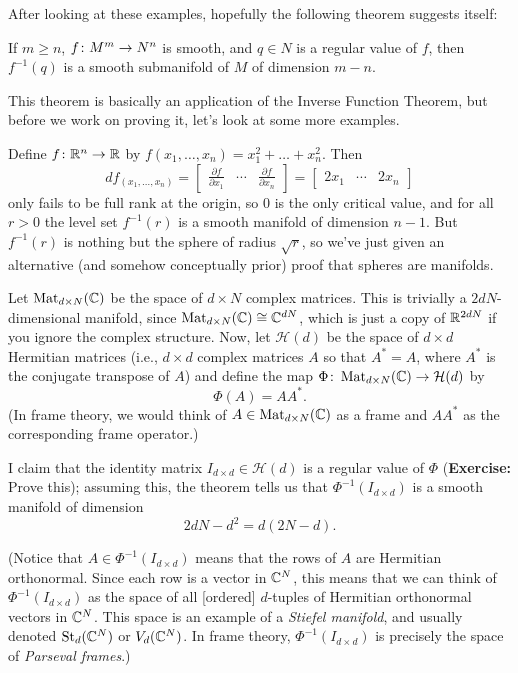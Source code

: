 	After looking at these examples, hopefully the following theorem suggests itself:
	
	\begin{theorem}\label{thm:level set theorem}
		If $m \geq n$, $f \colon\thinspace\! M^m \to N^n$ is smooth, and $q \in N$ is a regular value of $f$, then $f^{-1}(q)$ is a smooth submanifold of $M$ of dimension $m-n$.
	\end{theorem}
	
	This theorem is basically an application of the Inverse Function Theorem, but before we work on proving it, let's look at some more examples.
	
	\begin{example}\label{ex:sphere as level set}
		Define $f \colon\thinspace\! \mathbb{R}^n \to \mathbb{R}$ by $f(x_1,\dots , x_n) = x_1^2 + \dots + x_n^2$. Then
		\[
			df_{(x_1, \dots , x_n)}= \begin{bmatrix} \frac{\partial f}{\partial x_1} & \cdots & \frac{\partial f}{\partial x_n} \end{bmatrix} = \begin{bmatrix} 2x_1 & \cdots & 2x_n \end{bmatrix}
		\]
		only fails to be full rank at the origin, so 0 is the only critical value, and for all $r > 0$ the level set $f^{-1}(r)$ is a smooth manifold of dimension $n-1$. But $f^{-1}(r)$ is nothing but the sphere of radius $\sqrt{r}$, so we've just given an alternative (and somehow conceptually prior) proof that spheres are manifolds.
	\end{example}
	
	\begin{example}
		Let $\operatorname{Mat}_{d \times N}(\mathbb{C})$ be the space of $d \times N$ complex matrices. This is trivially a $2dN$-dimensional manifold, since $\operatorname{Mat}_{d \times N} (\mathbb{C}) \cong \mathbb{C}^{dN}$, which is just a copy of $\mathbb{R}^{2dN}$ if you ignore the complex structure. Now, let $\mathcal{H}(d)$ be the space of $d \times d$ Hermitian matrices (i.e., $d \times d$ complex matrices $A$ so that $A^\ast = A$, where $A^\ast$ is the conjugate transpose of $A$) and define the map $\Phi\colon\thinspace\! \operatorname{Mat}_{d \times N}(\mathbb{C}) \to \mathcal{H}(d)$ by
		\[
			\Phi(A) = A A^\ast.
		\]
		(In frame theory, we would think of $A \in \operatorname{Mat}_{d \times N}(\mathbb{C})$ as a frame and $A A^\ast$ as the corresponding frame operator.)
		
		I claim that the identity matrix $I_{d \times d} \in \mathcal{H}(d)$ is a regular value of $\Phi$ (\textbf{Exercise:} Prove this); assuming this, the theorem tells us that $\Phi^{-1}(I_{d \times d})$ is a smooth manifold of dimension
		\[
			2dN - d^2 = d(2N-d).
		\]
		
		(Notice that $A \in \Phi^{-1}(I_{d \times d})$ means that the rows of $A$ are Hermitian orthonormal. Since each row is a vector in $\mathbb{C}^N$, this means that we can think of $\Phi^{-1}(I_{d \times d})$ as the space of all [ordered] $d$-tuples of Hermitian orthonormal vectors in $\mathbb{C}^N$. This space is an example of a \emph{Stiefel manifold}, and usually denoted $\operatorname{St}_d(\mathbb{C}^N)$ or $V_d(\mathbb{C}^N)$. In frame theory, $\Phi^{-1}(I_{d \times d})$ is precisely the space of \emph{Parseval frames}.)
	\end{example}
	
